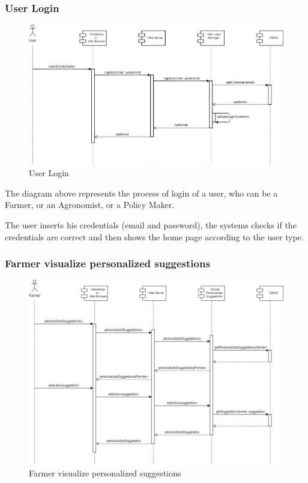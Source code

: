\documentclass{article}
\begin{document}
    \newpage

    
    \subsubsection{User Login}
        \begin{figure} [h]
            \centering
            \includegraphics[width=1\textwidth]{images/ArchitecturalDesign/RuntimeView/2. UserLogin.jpg}
            \caption{\label{fig:userLogin}User Login}
        \end{figure}
        
        The diagram above represents the process of login of a user, who can be a Farmer, or an Agronomist, or a Policy Maker. \par 
        The user inserts his credentials (email and password), the systems checks if the credentials are correct and then shows the home page according to the user type.
        
    
    \newpage
    
    
    \subsubsection{Farmer visualize personalized suggestions}
        \begin{figure} [h]
            \centering
            \includegraphics[width=1\textwidth]{images/ArchitecturalDesign/RuntimeView/3. FarmerVisualizePersonalizedSuggestions.jpg}
            \caption{\label{fig:farmerPersonalizedSuggestions}Farmer visualize personalized suggestions}
        \end{figure}
        
\end{document}
